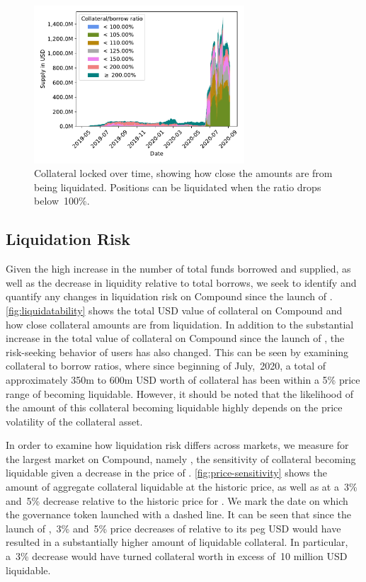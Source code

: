 \begin{figure}[tbp]
  \centering
  \includegraphics[width=0.7\textwidth]{./6-application-security/figures/supply-borrow-over-time.pdf}
  \caption{Collateral locked over time, showing how close the amounts are from being liquidated. Positions can be liquidated when the ratio drops below~100\%.}
  \label{fig:liquidatability}
\end{figure}

\subsection{Liquidation Risk}
Given the high increase in the number of total funds borrowed and supplied, as well as the decrease in liquidity relative to total borrows, we seek to identify and quantify any changes in liquidation risk on Compound since the launch of . 
\autoref{fig:liquidatability} shows the total USD value of collateral on Compound and how close collateral amounts are from liquidation. 
In addition to the substantial increase in the total value of collateral on Compound since the launch of , the risk-seeking behavior of users has also changed.
This can be seen by examining collateral to borrow ratios, where since beginning of July,~2020, a total of approximately 350m to 600m USD worth of collateral has been within a 5\% price range of becoming liquidable.
However, it should be noted that the likelihood of the amount of this collateral becoming liquidable highly depends on the price volatility of the collateral asset.

In order to examine how liquidation risk differs across markets, we measure for the largest market on Compound, namely , the sensitivity of collateral becoming liquidable given a decrease in the price of .
\autoref{fig:price-sensitivity} shows the amount of aggregate collateral liquidable at the historic price, as well as at a~3\% and~5\% decrease relative to the historic price for .
We mark the date on which the  governance token launched with a dashed line.
It can be seen that since the launch of ,~3\% and~5\% price decreases of  relative to its peg USD would have resulted in a substantially higher amount of liquidable collateral.
In particular, a~3\% decrease would have turned collateral worth in excess of~10 million USD liquidable.

